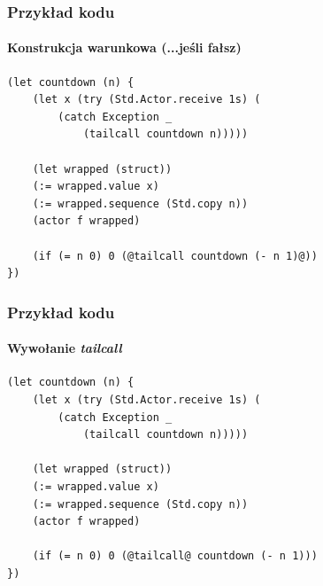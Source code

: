 \documentclass[aspectratio=169]{beamer}
\begin{document}
\begin{frame}[fragile]
    \frametitle{Przykład kodu}
    \framesubtitle{Konstrukcja warunkowa (...jeśli fałsz)}

    \begin{small}
    \begin{lstlisting}
(let countdown (n) {
    (let x (try (Std.Actor.receive 1s) (
        (catch Exception _
            (tailcall countdown n)))))

    (let wrapped (struct))
    (:= wrapped.value x)
    (:= wrapped.sequence (Std.copy n))
    (actor f wrapped)

    (if (= n 0) 0 (@tailcall countdown (- n 1)@))
})
    \end{lstlisting}
    \end{small}
\end{frame}

\begin{frame}[fragile]
    \frametitle{Przykład kodu}
    \framesubtitle{Wywołanie \emph{tailcall}}

    \begin{small}
    \begin{lstlisting}
(let countdown (n) {
    (let x (try (Std.Actor.receive 1s) (
        (catch Exception _
            (tailcall countdown n)))))

    (let wrapped (struct))
    (:= wrapped.value x)
    (:= wrapped.sequence (Std.copy n))
    (actor f wrapped)

    (if (= n 0) 0 (@tailcall@ countdown (- n 1)))
})
    \end{lstlisting}
    \end{small}
\end{frame}

\end{document}
